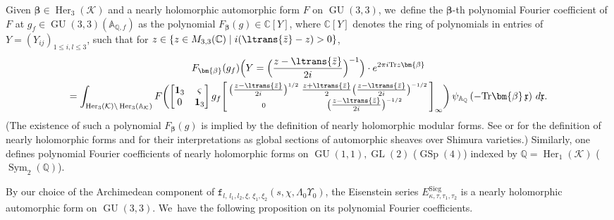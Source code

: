 \documentclass[JEP,XML,SOM,Unicode,published]{cedram}
\newenvironment{bsm}
{\left[\begin{smallmatrix}}
{\end{smallmatrix}\right]}
\theoremstyle{plain}
\theoremstyle{remark}
\let\mr\mathrm
\newcommand{\bA}{\mathbb{A}}
\newcommand{\bC}{\mathbb{C}}
\newcommand{\bQ}{\mathbb{Q}}
\newcommand{\cK}{\mathcal{K}}
\newcommand{\fx}{\mathfrak{x}}
\newcommand{\bbeta}{\bm{\beta}}
\DeclareMathOperator{\GL}{GL}
\DeclareMathOperator{\GSp}{GSp}
\DeclareMathOperator{\GU}{GU}
\newcommand{\Tr}{\mathrm{Tr}}
\newcommand{\Sieg}{\mr{Sieg}}
\DeclareMathOperator{\Her}{Her}
\DeclareMathOperator{\Sym}{Sym}
\newcommand{\bid}{\mathbf{1}}
\newcommand{\dsec}{{\texttt f}}
\begin{document}
Given $\bbeta\in\Her_3(\cK)$ and a nearly holomorphic automorphic form $F$ on $\GU(3,3)$, we~define the $\bbeta$-th polynomial Fourier coefficient of $F$ at $g_f\in \GU(3,3)(\bA_{\bQ,f})$ as the polynomial $F_{\bbeta}(g)\in \bC[Y]$, where $\bC[Y]$ denotes the ring of polynomials in entries of $Y=(Y_{ij})_{1\leq i,l\leq 3}$, such that for $z\in \left\{z\in M_{3,3}(\bC)\mid i(\ltrans{\bar{z}}-z)>0\right\}$,\vspace*{-5pt}
\begin{multline*}
F_{\bbeta}(g_f)\Bigl(Y=\Bigl(\frac{z-\ltrans{\bar{z}}}{2i}\Bigr)^{-1}\Bigr)\cdot e^{2\pi i\Tr z\bbeta}\\
=\int_{\Her_3(\cK)\backslash\Her_3(\bA_\cK)} F\biggl(\begin{bmatrix}\bid_3&\varsigma\\0&\bid_3\end{bmatrix}g_f\begin{bsm}\bigl(\tfrac{z-\ltrans{\bar{z}}}{2i}\bigr)^{1/2}&\tfrac{z+\ltrans{\bar{z}}}{2}\bigl(\tfrac{z-\ltrans{\bar{z}}}{2i}\bigr)^{-1/2}\\0&\bigl(\tfrac{z-\ltrans{\bar{z}}}{2i}\bigr)^{-1/2}\end{bsm}_\infty\biggr)\, \psi_{\bA_\bQ}\left(-\Tr\bbeta\,\fx\right)\,d\fx.
\end{multline*}
(The existence of such a polynomial $F_{\bbeta}(g)$ is implied by the definition of nearly holomorphic modular forms. See \cite[\S13.11]{Sh00} or \cite[\S3.2]{pFL} for the definition of nearly holomorphic forms and \cite[\S2.4]{NHF} for their interpretations as global sections of automorphic sheaves over Shimura varieties.) Similarly, one defines polynomial Fourier coefficients of nearly holomorphic forms on $\GU(1,1),\GL(2)$ (\resp $\GSp(4)$) indexed by $\bQ=\Her_1(\cK)$ (\resp $\Sym_2(\bQ)$).

By our choice of the Archimedean component of $ \dsec_{l,\,l_1,l_2,\xi,\,\xi_1,\xi_2}(s,\chi,\Lambda_0\Upsilon_0)$, the Eisenstein series $E^\Sieg_{\kappa,\tau,\tau_1,\tau_2}$ is a nearly holomorphic automorphic form on $\GU(3,3)$. We~have the following proposition on its polynomial Fourier coefficients.
\end{document}
